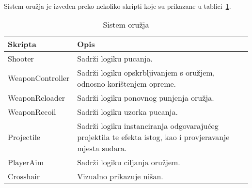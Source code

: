 Sistem oružja je izveden preko nekoliko skripti koje su prikazane u
tablici~\ref{fig:WeaponSystemTable}.
\begin{table}
\begin{tabularx}{0.9\textwidth}{lX}
\hline
Skripta&Opis \\
\hline
Shooter&Sadrži logiku pucanja. \\
WeaponController&Sadrži logiku opskrbljivanjem s oružjem, odnosno korištenjem
opreme.\\
WeaponReloader&Sadrži logiku ponovnog punjenja oružja.\\
WeaponRecoil&Sadrži logiku uzorka pucanja. \\
Projectile&Sadrži logiku instanciranja odgovarajućeg projektila te efekta istog, kao
i provjeravanje mjesta sudara. \\
PlayerAim&Sadrži logiku ciljanja oružjem. \\
Crosshair&Vizualno prikazuje nišan. \\
\hline
\end{tabularx}
\caption{Sistem oružja}\label{fig:WeaponSystemTable}
\end{table}

